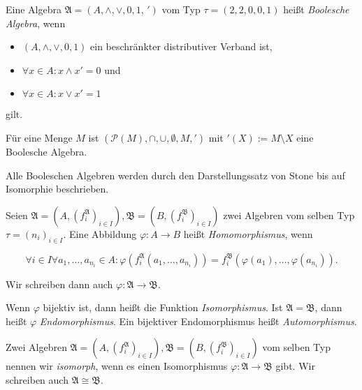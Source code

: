 \begin{definition}\label{def:boolsche_algebra}
    Eine Algebra $\mathfrak{A} = (A, \wedge, \vee, 0, 1, \,')$ vom Typ $\tau = (2,2,0,0,1)$ heißt \emph{Boolesche Algebra}, wenn
    \begin{itemize}
        \item $(A, \wedge, \vee, 0, 1)$ ein beschränkter distributiver Verband ist,
        \item $\forall x \in A: x \wedge x' = 0$ und
        \item $\forall x \in A: x \vee x' = 1$
    \end{itemize}
    gilt.
\end{definition}

\begin{example}
    Für eine Menge $M$ ist $(\mathcal{P}(M), \cap, \cup, \emptyset, M, ')$ mit $'(X) := M \setminus X$ eine Boolesche Algebra.
\end{example}

\begin{remark}
    Alle Booleschen Algebren werden durch den Darstellungssatz von Stone bis auf Isomorphie beschrieben.
\end{remark}

\begin{definition}
    Seien $\mathfrak{A} = (A, (f_i^\mathfrak{A})_{i \in I}), \mathfrak{B} = (B, (f_i^\mathfrak{B})_{i \in I})$ zwei Algebren vom selben Typ $\tau = (n_i)_{i \in I}$. Eine Abbildung $\varphi: A \to B$ heißt \emph{Homomorphismus}, wenn

    $$\forall i \in I \forall a_1, \ldots, a_{n_i} \in A: \varphi(f_i^\mathfrak{A}(a_1, \ldots, a_{n_i})) = f_i^\mathfrak{B}(\varphi(a_1), \ldots, \varphi(a_{n_i})). $$

    Wir schreiben dann auch $\varphi : \mathfrak{A} \to \mathfrak{B}$.

    Wenn $\varphi$ bijektiv ist, dann heißt die Funktion \emph{Isomorphismus}.
    Ist $\mathfrak{A} = \mathfrak{B}$, dann heißt $\varphi$ \emph{Endomorphismus}. Ein bijektiver Endomorphismus heißt \emph{Automorphismus}.
\end{definition}

\begin{definition}
    Zwei Algebren $\mathfrak{A} = (A, (f_i^\mathfrak{A})_{i \in I}), \mathfrak{B} = (B, (f_i^\mathfrak{B})_{i \in I})$ vom selben Typ nennen wir \emph{isomorph}, wenn es einen Isomorphismus $\varphi: \mathfrak{A} \to \mathfrak{B}$ gibt. Wir schreiben auch $\mathfrak{A} \cong \mathfrak{B}$.
\end{definition}

